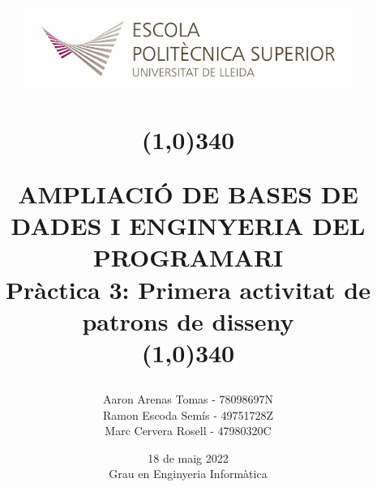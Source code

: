 \title{
	\begin{center}
	\vspace{3cm}
	\includegraphics[width=11cm, height=3cm]{images/Logo-nou-eps.jpg}
	\end{center}
	\begin{center}
	\line(1,0){340}
	\end{center}		
	AMPLIACIÓ DE BASES DE DADES I ENGINYERIA DEL PROGRAMARI\\
	\vspace{2mm}
	\Large Pràctica 3: Primera activitat de patrons de disseny\\
	\line(1,0){340}
	\vspace{2.5cm}
	}

\author{Aaron Arenas Tomas - 78098697N \\ Ramon Escoda Semís - 49751728Z \\   Marc Cervera Rosell - 47980320C \vspace{1cm}}


\date{18 de maig 2022\vspace{0.5cm} \\Grau en Enginyeria Informàtica}
